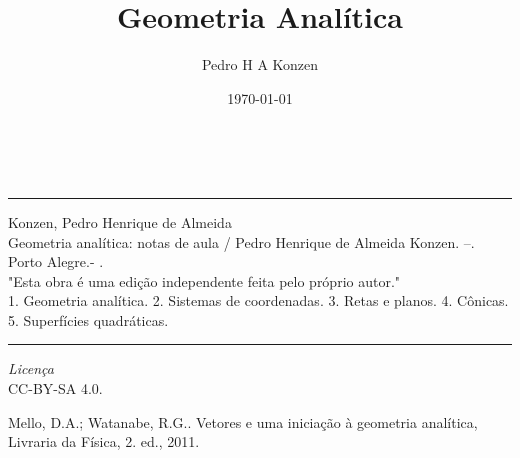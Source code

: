 \documentclass[12pt]{book}
\begin{document}
\ifispython
\lstset { %
  language=Python,
  numbers=left,
  numberstyle=\small,
  stepnumber=1,    
  firstnumber=1,
  numberfirstline=true,
  extendedchars=true,
  inputencoding=utf8,
  upquote=true,
  basicstyle=\ttfamily,
  keywordstyle=\ttfamily,
  stringstyle=\ttfamily,
  commentstyle=\ttfamily,
  showspaces=false,
  showstringspaces=false,
  showtabs=false
}
\fi


\frontmatter

\title{Geometria Analítica}
\author{Pedro H A Konzen}
\date{\today}
\ifishtml
\else
{}
\fi

\maketitle

\ifisbook
~
\vspace{4.5in}
\hrule
Konzen, Pedro Henrique de Almeida\\
\indent\hspace{2em}Geometria analítica: notas de aula / Pedro Henrique de Almeida Konzen. --{\the\year}. Porto Alegre.- {\the\year}.\\
\indent\hspace{2em}"Esta obra é uma edição independente feita pelo próprio autor."\\
\indent\hspace{2em}1. Geometria analítica. 2. Sistemas de coordenadas. 3. Retas e planos. 4. Cônicas. 5. Superfícies quadráticas.\\
\hrule
\vspace{1cm}
\begin{center}
  \textit{Licença}\\CC-BY-SA 4.0.
\end{center}
\fi





\tableofcontents
{}

\mainmatter


% 
% 
% 




\ifisbook

\fi

\begin{thebibliography}{99}
  
  Mello, D.A.; Watanabe, R.G.. Vetores e uma iniciação à geometria analítica, Livraria da Física, 2. ed., 2011.

\end{thebibliography}
\end{document}

